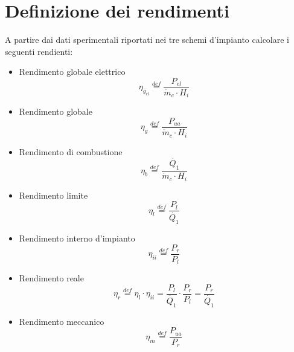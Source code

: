 \documentclass[a4paper,12pt]{article}
\begin{document}
\section{Definizione dei rendimenti}
A partire dai dati sperimentali riportati nei tre schemi d'impianto calcolare i seguenti rendienti:
\begin{itemize}
    \item Rendimento globale elettrico
    \begin{equation}
        \label{eq:rendimento_elettrico}
        \eta_{g_{el}} \stackrel{def}{=} \frac{P_{el}}{\dot m_c \cdot H_i}
    \end{equation}
    
    \item Rendimento globale
    \begin{equation}
        \label{eq:rendimento_globale}
        \eta_g \stackrel{def}{=} \frac{P_{ua}}{\dot{m}_c \cdot H_i}
   \end{equation}

   \item Rendimento di combustione
   \begin{equation}
       \label{eq:rendimento_combustione}
       \eta_b \stackrel{def}{=} \frac{\dot{Q_1}}{\dot{m}_c \cdot H_i}
   \end{equation}

   \item Rendimento limite
   \begin{equation}
       \label{eq:redimento_limite}
       \eta_l \stackrel{def}{=} \frac{P_l}{\dot{Q_1}}
   \end{equation}

   \item Rendimento interno d'impianto
   \begin{equation}
        \label{eq:rendimento_interno}
       \eta_{ii} \stackrel{def}{=} \frac{P_r}{P_l}
   \end{equation}

   \item Rendimento reale
   \begin{equation}
       \label{eq:rendimento_reale}
       \eta_r \stackrel{def}{=} \eta_l \cdot \eta_{ii} = \frac{P_l}{\dot{Q_1}} \cdot \frac{P_r}{P_l} = \frac{P_r}{\dot{Q_1}}
   \end{equation}

   \item Rendimento meccanico
   \begin{equation}
       \label{eq:rendimento_meccanico}
       \eta_m \stackrel{def}{=} \frac{P_{ua}}{P_r}
   \end{equation}



\end{itemize}
\end{document}
